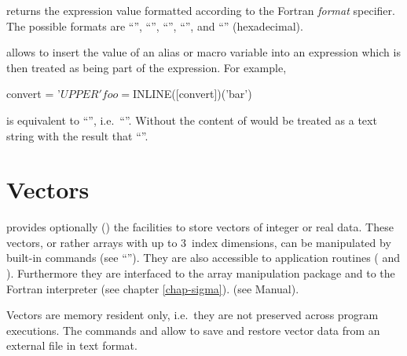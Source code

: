 \begin{UL}

\item
{} returns the expression
value formatted according to the Fortran \textsl{format} specifier.
The possible formats are ``'', ``'', ``'',
``'', and ``'' (hexadecimal).

\item
{} allows to insert the value of an alias
or macro variable into an expression which is then treated as being part
of the expression.
For example,
\begin{XMP}
convert = '$UPPER'
foo = $INLINE([convert])('bar')
\end{XMP}
is equivalent to ``'', 
i.e.\ ``''.
Without  the content of \Lit{[convert]} would be
treated as a text string with the result that 
``''.

\end{UL}

\ifPAWman %

\fi


%
%

\ifVECTOR

\section{Vectors}

\KUIP{} provides optionally () the facilities to store
vectors of integer or real data.
These vectors, or rather arrays with up to 3~index dimensions, can be
manipulated by \KUIP{} built-in commands (see ``'').
They are also accessible to application routines ( and
).
Furthermore they are interfaced to the array manipulation package
\SIGMA{} and to the Fortran interpreter \COMIS{}
\ifPAWman
(see chapter \ref{chap-sigma}).
\else
(see \PAW{} Manual\cite{bib-PAW}).
\fi

Vectors are memory resident only, i.e.\ they are not preserved across
program executions.
The commands  and  allow to save and
restore vector data from an external file in text format.

